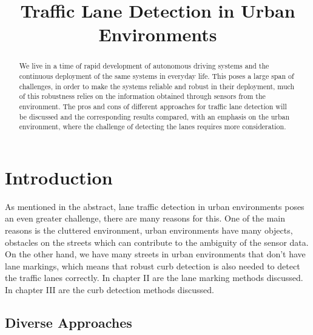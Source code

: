 \documentclass[conference]{IEEEtran}
\begin{document}
%
\title{Traffic Lane Detection in Urban Environments}


\author{
}


\maketitle


\begin{abstract}
We live in a time of rapid development of autonomous driving systems and the continuous deployment of the same systems in everyday life. This poses a large span of challenges, in order to make the systems reliable and robust in their deployment, much of this robustness relies on the information obtained through sensors from the environment. The pros and cons of different approaches for traffic lane detection will be discussed and the corresponding results compared, with an emphasis on the urban environment, where the challenge of detecting the lanes requires more consideration. 
\end{abstract}



\IEEEpeerreviewmaketitle



\section{Introduction}

As mentioned in the abstract, lane traffic detection in urban environments poses an even greater challenge, there are many reasons for this. One of the main reasons is the cluttered environment, urban environments have many objects, obstacles on the streets which can contribute to the ambiguity of the sensor data. On the other hand, we have many streets in urban environments that don't have lane markings, which means that robust curb detection is also needed to detect the traffic lanes correctly. In chapter II are the lane marking methods discussed. In chapter III are the curb detection methods discussed. 

\subsection{Diverse Approaches}
\end{document}
